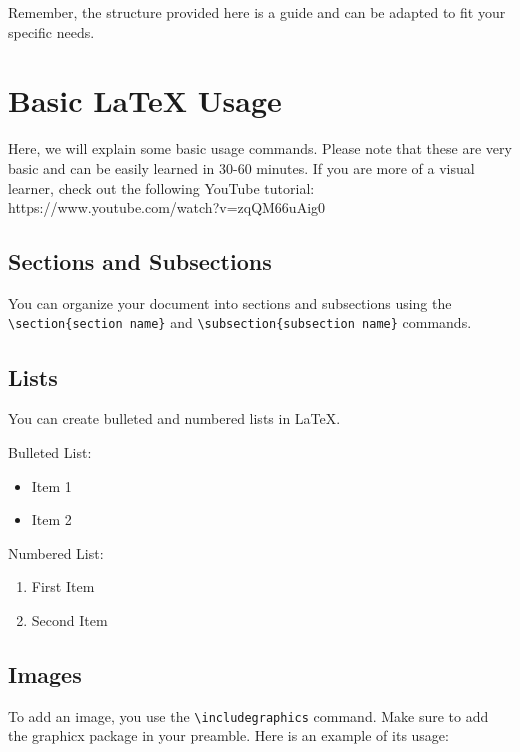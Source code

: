 Remember, the structure provided here is a guide and can be adapted to fit your specific needs.

\section{Basic LaTeX Usage}
Here, we will explain some basic usage commands. Please note that these are very basic and can be easily learned in 30-60 minutes. If you are more of a visual learner, check out the following YouTube tutorial:
https://www.youtube.com/watch?v=zqQM66uAig0

\subsection{Sections and Subsections}
You can organize your document into sections and subsections using the \verb|\section{section name}| and \verb|\subsection{subsection name}| commands.

\subsection{Lists}
You can create bulleted and numbered lists in LaTeX.

Bulleted List:
\begin{itemize}
    \item Item 1
    \item Item 2
\end{itemize}

Numbered List:
\begin{enumerate}
    \item First Item
    \item Second Item
\end{enumerate}

\subsection{Images}
To add an image, you use the \verb|\includegraphics| command. Make sure to add the graphicx package in your preamble. Here is an example of its usage:

